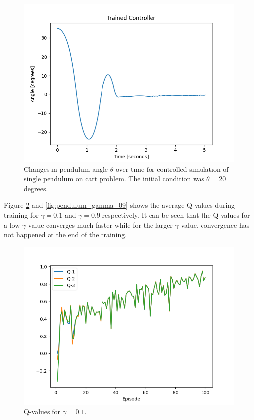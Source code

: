 \documentclass[final]{LTHtwocol} %
\begin{document}
\begin{figure}[htp]
	\centering
	\includegraphics[width=0.9\columnwidth]{figures/Pendulum_angle_35.png}
	\caption{Changes in pendulum angle $\theta$ over time for controlled simulation of single pendulum on cart problem. The initial condition was $\theta = 20$ degrees.}
	\label{fig:single_pendulum_outside_training_domain}
\end{figure}
Figure \ref{fig:pendulum_gamma_01} and \ref{fig:pendulum_gamma_09} shows the average Q-values during training for $\gamma=0.1$ and $\gamma=0.9$ respectively. It can be seen that the Q-values for a low $\gamma$ value converges much faster while for the larger $\gamma$ value, convergence has not happened at the end of the training.
\begin{figure}[htp]
	\centering
	\includegraphics[width=0.9\columnwidth]{figures/Pendulum_q_gamma_01.png}
	\caption{Q-values for $\gamma=0.1$.}
	\label{fig:pendulum_gamma_01}
\end{figure} 
\end{document}
